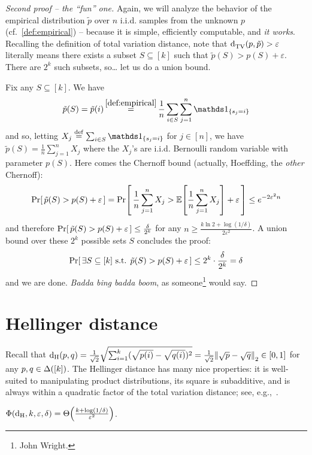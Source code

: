 \documentclass[10pt]{article}
\newcommand{\dst}{\varepsilon}
\newcommand{\ab}{k}
\newcommand{\ns}{n}
\begin{document}
\begin{proof}[Second proof -- the ``fun'' one]
Again, we will analyze the behavior of the empirical distribution $\tilde{p}$ over $\ns$ i.i.d. samples from the unknown $p$ (cf.~\eqref{def:empirical}) -- because it is simple, efficiently computable, and \emph{it works}.  Recalling the definition of total variation distance, note that $\totalvardist{p}{\tilde{p}} > \dst$ literally means there exists a subset $S\subseteq [\ab]$ such that $\tilde{p}(S) > p(S) + \dst$. There are $2^\ab$ such subsets, so\dots{} let us do a union bound.

Fix any $S\subseteq[\ab]$. We have
\[
\tilde{p}(S) = \tilde{p}(i) \operatorname*{=}^{\eqref{def:empirical}} \frac{1}{\ns} \sum_{i\in S} \sum_{j=1}^\ns \indic{s_j=i}
\]
and so, letting $X_j \eqdef \sum_{i\in S}\indic{s_j=i}$ for $j\in [\ns]$, we have
$
\tilde{p}(S) = \frac{1}{\ns}\sum_{j=1}^\ns X_j
$ where the $X_j$'s are i.i.d. Bernoulli random variable with parameter $p(S)$. Here comes the Chernoff bound (actually, Hoeffding, the \emph{other} Chernoff):
\[
    \probaOf{ \tilde{p}(S) > p(S) + \dst } = \probaOf{ \frac{1}{\ns}\sum_{j=1}^\ns X_j > \expect{\frac{1}{\ns}\sum_{j=1}^\ns X_j} + \dst } \leq e^{-2\dst^2 \ns}
\]
and therefore $\probaOf{ \tilde{p}(S) > p(S) + \dst } \leq \frac{\delta}{2^\ab}$ for any $\ns\geq \frac{\ab\ln 2+\log(1/\delta)}{2\dst^2}$. A union bound over these $2^\ab$ possible sets $S$ concludes the proof:
\[
    \probaOf{ \exists S\subseteq [\ab] \text{ s.t. }\tilde{p}(S) > p(S) + \dst } \leq 2^\ab\cdot \frac{\delta}{2^\ab} = \delta
\]
and we are done. \emph{Badda bing badda boom}, as someone\footnote{John Wright.} would say.
\end{proof}

\section{Hellinger distance}

Recall that $\hellinger{p}{q} = \frac{1}{\sqrt{2}}\sqrt{\sum_{i=1}^\ab (\sqrt{p(i)}-\sqrt{q(i)})^2} = \frac{1}{\sqrt{2}}\normtwo{\sqrt{p}-\sqrt{q}}\in[0,1]$ for any $p,q\in\distribs{[\ab]}$. The Hellinger distance has many nice properties: it is well-suited to manipulating product distributions, its square is subadditive, and is always within a quadratic factor of the total variation distance; see, e.g.,~\cite[Appendix~C.2]{Canonne:15}.

\begin{theorem}\label{theo:learning:hellinger}
  $\Phi(\dhell,\ab,\dst,\delta) = \bigTheta{\frac{\ab+\log(1/\delta)}{\dst^2}}$.
\end{theorem}
\end{document}
